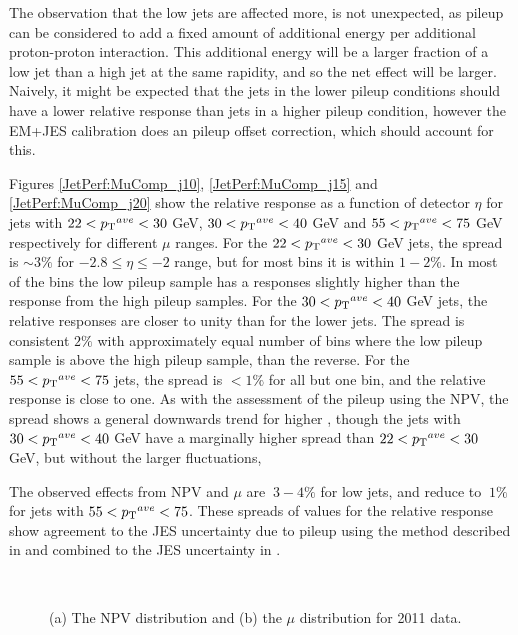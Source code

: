 The observation that the low \ptave{} jets are affected more, is not unexpected, as pileup can be considered to add a fixed amount of additional energy per additional proton-proton interaction.
This additional energy will be a larger fraction of a low \pt{} jet than a high \pt{} jet at the same rapidity, and so the net effect will be larger.
Naively, it might be expected that the jets in the lower pileup conditions should have a lower relative response than jets in a higher pileup condition, however the EM+JES calibration does an pileup offset correction, which should account for this.


Figures \ref{JetPerf:MuComp_j10}, \ref{JetPerf:MuComp_j15} and \ref{JetPerf:MuComp_j20}  show the relative response as a function of detector $\eta$ for jets with $22<\mbox{$\mbox{$p_{\rm T}$}{}^{ave}$}{}<30$ GeV, $30<\mbox{$\mbox{$p_{\rm T}$}{}^{ave}$}{}<40$ GeV and $55<\mbox{$\mbox{$p_{\rm T}$}{}^{ave}$}{}<75$ GeV respectively for different $\mu$ ranges.
For the $22<\mbox{$\mbox{$p_{\rm T}$}{}^{ave}$}{}<30$ GeV jets, the spread  is $\sim 3\%$ for $-2.8\le\eta\le-2$ range, but for most bins it is within $ 1-2\%$.
In most of the bins the low pileup sample has a responses slightly higher than the response from the high pileup samples.
For the $30<\mbox{$\mbox{$p_{\rm T}$}{}^{ave}$}{}<40$ GeV jets, the relative responses are closer to unity than for the lower \ptave{} jets.
The spread is consistent $2\%$ with approximately equal number of bins where the low pileup sample is above the high pileup sample, than the reverse.
For the $55<\mbox{$\mbox{$p_{\rm T}$}{}^{ave}$}{}<75$ jets, the spread is $<1\%$ for all but one bin, and the relative response is close to one.  
As with the assessment of the pileup using the NPV, the spread shows a general downwards trend for higher \ptave{}, though the jets with $30<\mbox{$\mbox{$p_{\rm T}$}{}^{ave}$}{}<40$ GeV have a marginally higher spread than $22<\mbox{$\mbox{$p_{\rm T}$}{}^{ave}$}{}<30$ GeV, but without the larger fluctuations,

The observed effects from NPV and $\mu$ are $~3-4\%$ for low \ptave{} jets, and reduce to $~1\%$ for jets with $55<\mbox{$\mbox{$p_{\rm T}$}{}^{ave}$}{}<75$.
These spreads of values for the relative response show agreement to the JES uncertainty due to pileup using the method described in \cite{ref:Pileup} and combined to the JES uncertainty in \cite{ref:JES2011}.



\begin{figure}
\centering
\mbox{
              \quad
              \quad
                              }
\caption[Number of primary vertices and $\mu{}$ for 2011 data]{
(a) The NPV distribution and (b) the $\mu$ distribution for 2011 data.
\label{JetPerf:NPV_Mu}}
\end{figure}



